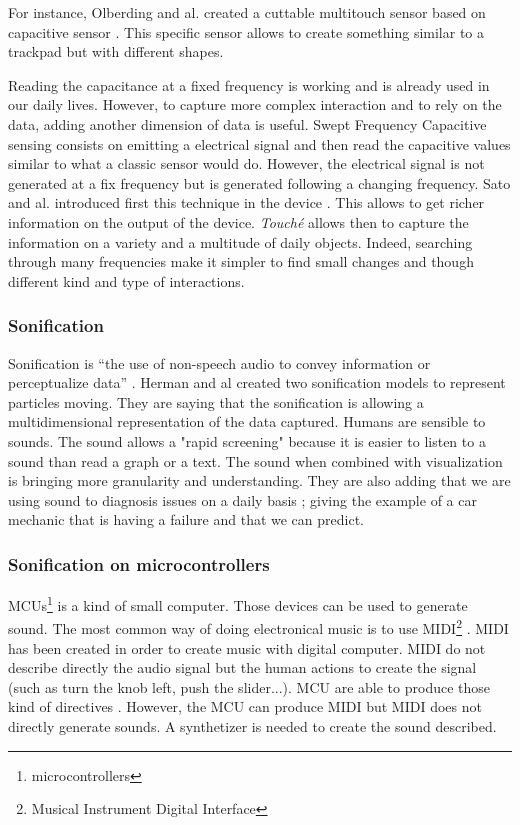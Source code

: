 For instance, Olberding and al. created a cuttable multitouch sensor based on capacitive sensor \cite{olberdingCuttableMultitouchSensor2013}.
This specific sensor allows to create something similar to a trackpad but with different shapes.

Reading the capacitance at a fixed frequency is working and is already used in our daily lives. 
However, to capture more complex interaction and to rely on the data, adding another dimension of data is useful.
Swept Frequency Capacitive sensing consists on emitting a electrical signal and then read the capacitive values
similar to what a classic sensor would do. However, the electrical signal is not generated at a fix frequency
but is generated following a changing frequency. 
Sato and al. introduced first this technique in the  device \cite{satoToucheEnhancingTouch2012}.
This allows to get richer information on the output of the device. \textit{Touché} allows then to capture 
the information on a variety and a multitude of daily objects.
Indeed, searching through many frequencies make it simpler to find small changes and though different kind and type 
of interactions.

\subsubsection{Sonification}

Sonification is “the use of non-speech audio to convey information or perceptualize data” \cite{hermannListenYourData}.
Herman and al \cite{hermannListenYourData} created two sonification models to represent particles moving. They are 
saying that the sonification is allowing a multidimensional representation of the data captured.
Humans are sensible to sounds. The sound allows a "rapid screening" because it is easier to listen to a sound than
read a graph or a text. The sound when combined with visualization is bringing more granularity and understanding.
They are also adding that we are using sound to diagnosis issues on a daily basis ; giving the example of a car
mechanic that is having a failure and that we can predict.


\subsubsection{Sonification on microcontrollers}

MCUs\footnote{microcontrollers} \cite{rochim2019design} is a kind of small computer.
Those devices can be used to generate sound. The most common way of doing electronical music
is to use MIDI\footnote{Musical Instrument Digital Interface} \cite{loyMusiciansMakeStandard1985}.
MIDI has been created in order to create music with digital computer. MIDI do not describe directly 
the audio signal but the human actions to create the signal (such as turn the knob left, push the slider...).
MCU are able to produce those kind of directives \cite{fazendaProceedingsInternationalConference1}\cite{fazendaProceedingsInternationalConference2}.
However, the MCU can produce MIDI but MIDI does not directly generate sounds. A synthetizer is needed to create the sound
described.

